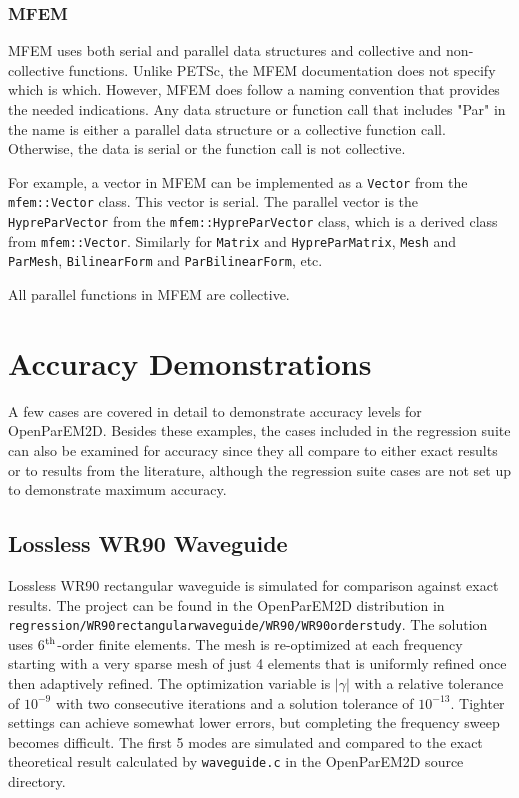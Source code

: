 \documentclass[titlepage]{article}
\renewcommand\_{\textunderscore\linebreak[1]}
\begin{document}
\subsubsection{MFEM}

MFEM uses both serial and parallel data structures and collective and non-collective functions.  Unlike PETSc, the MFEM documentation does not specify which is which. However, MFEM does follow a naming convention that provides the needed indications.  Any data structure or function call that includes "Par" in the name is either a parallel data structure or a collective function call.  Otherwise, the data is serial or the function call is not collective.

For example, a vector in MFEM can be implemented as a \texttt{Vector} from the \texttt{mfem::Vector} class.  This vector is serial.  The parallel vector is the \texttt{HypreParVector} from the \texttt{mfem::HypreParVector} class, which is a derived class from \texttt{mfem::Vector}.  Similarly for \texttt{Matrix} and \texttt{HypreParMatrix}, \texttt{Mesh} and \texttt{ParMesh}, \texttt{BilinearForm} and \texttt{ParBilinearForm}, etc.

All parallel functions in MFEM are collective.

\section{Accuracy Demonstrations}
\label{sec:accuracy}

A few cases are covered in detail to demonstrate accuracy levels for OpenParEM2D.  Besides these examples, the cases included in the regression suite can also be examined for accuracy since they all compare to either exact results or to results from the literature, although the regression suite cases are not set up to demonstrate maximum accuracy.

\subsection{Lossless WR90 Waveguide}
\label{sec:WR90_lossless}

Lossless WR90 rectangular waveguide is simulated for comparison against exact results.  The project can be found in the OpenParEM2D distribution in \texttt{regression/WR90\_rectangular\_waveguide/WR90/WR90\_order\_6\_study}. The solution uses 6$^{\textnormal{th}}$-order finite elements.  The mesh is re-optimized at each frequency starting with a very sparse mesh of just 4 elements that is uniformly refined once then adaptively refined. The optimization variable is $|\gamma|$ with a relative tolerance of $10^{-9}$ with two consecutive iterations and a solution tolerance of $10^{-13}$.  Tighter settings can achieve somewhat lower errors, but completing the frequency sweep becomes difficult.  The first 5 modes are simulated and compared to the exact theoretical result calculated by \texttt{waveguide.c} in the OpenParEM2D source directory.
\end{document}
